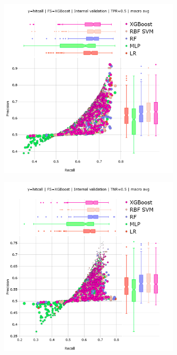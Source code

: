 \begin{figure}
\centering
\begin{subfigure}[b]{0.48\textwidth}
    \centering
    \includegraphics[width=\textwidth]{generated_results/hitcall_classification_Feature_Selection_XGBClassifier_val_tpr_macro_avg.png}
    \caption{}
\label{fig:hitcall_classification_Feature_Selection_XGBClassifier_val_tpr_macro_avg}
\end{subfigure}
\hfill
\begin{subfigure}[b]{0.48\textwidth}
    \centering
    \includegraphics[width=\textwidth]{generated_results/hitcall_classification_Feature_Selection_XGBClassifier_val_tnr_macro_avg.png}

\end{subfigure}
\end{figure}
